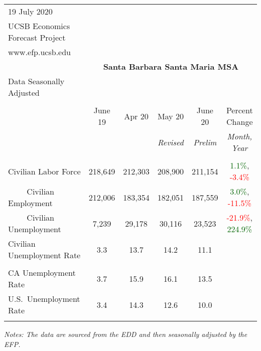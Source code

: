 \documentclass[12pt]{article}
\begin{document}
\begin{table}
\begin{tabular}{|l|c|c|c|c|c|}
\multicolumn{1}{l}{\small 19 July 2020} & \multicolumn{5}{c}{} \\
\multicolumn{1}{l}{\small UCSB Economics Forecast Project} & \multicolumn{5}{c}{} \\
\multicolumn{1}{l}{\small www.efp.ucsb.edu} & \multicolumn{5}{c}{} \\
\multicolumn{1}{c}{} & \multicolumn{5}{c}{\large \textbf{Santa Barbara Santa Maria MSA}} \\
\multicolumn{1}{l}{\small Data Seasonally Adjusted} & \multicolumn{5}{c}{} \\ \hline \hline
& & & & & \\
 & June 19 & Apr 20 & May 20 & June 20 & Percent Change \\
 & & & \small \textit{Revised} & \small \textit{Prelim} & \small \textit{Month, Year} \\ \hline
& & & & & \\
Civilian Labor Force & 218,649 & 212,303 & 208,900 & 211,154 & \textcolor{darkgreen}{1.1\%}, \textcolor{red}{-3.4\%} \\
$\qquad$ \small Civilian Employment & 212,006 & 183,354 & 182,051 & 187,559 & \textcolor{darkgreen}{3.0\%}, \textcolor{red}{-11.5\%} \\
$\qquad$ \small Civilian Unemployment & 7,239 & 29,178 & 30,116 & 23,523 & \textcolor{red}{-21.9\%}, \textcolor{darkgreen}{224.9\%} \\
Civilian Unemployment Rate & 3.3 & 13.7 & 14.2 & 11.1 & \\
& & & & & \\
CA Unemployment Rate & 3.7 & 15.9 & 16.1 & 13.5 & \\
U.S.\ Unemployment Rate & 3.4 & 14.3 & 12.6 & 10.0 & \\
& & & & & \\ \hline \hline
\end{tabular}
\par
\vspace{.5em}
\footnotesize
\textit{Notes: The data are sourced from the EDD and then seasonally adjusted by the EFP.}
\end{table}
\end{document}
